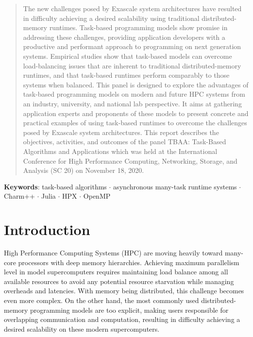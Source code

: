 \documentclass[12pt,letterpaper]{article}
\begin{document}
\begin{abstract}
The new challenges posed by Exascale system architectures have resulted in difficulty achieving a desired scalability using traditional distributed-memory runtimes. Task-based programming models show promise in addressing these challenges, providing application developers with a productive and performant approach to programming on next generation systems. Empirical studies show that task-based models can overcome load-balancing issues that are inherent to traditional distributed-memory runtimes, and that task-based runtimes perform comparably to those systems when balanced. This panel is designed to explore the advantages of task-based programming models on modern and future HPC systems from an industry, university, and national lab perspective. It aims at gathering application experts and proponents of these models to present concrete and practical examples of using task-based runtimes to overcome the challenges posed by Exascale system architectures. This report describes the objectives, activities, and outcomes of the panel TBAA: Task-Based Algorithms and Applications which was held at the International Conference for High Performance Computing, Networking, Storage, and Analysis (SC 20) on  November 18, 2020.
\end{abstract}

{\small
\textbf{Keywords}: task-based algorithms $\cdot$ asynchronous many-task runtime systems $\cdot$ Charm++ $\cdot$ Julia $\cdot$ HPX $\cdot$ OpenMP}

\section{Introduction}
High Performance Computing Systems (HPC) are moving heavily toward many-core processors with deep memory hierarchies. Achieving maximum parallelism level in model supercomputers requires maintaining load balance among all available resources to avoid any potential resource starvation while managing overheads and latencies. With memory being distributed, this challenge becomes even more complex. On the other hand, the most commonly used distributed-memory programming models are too explicit, making users responsible for overlapping communication and computation, resulting in difficulty achieving a desired scalability on these modern supercomputers.
\end{document}
